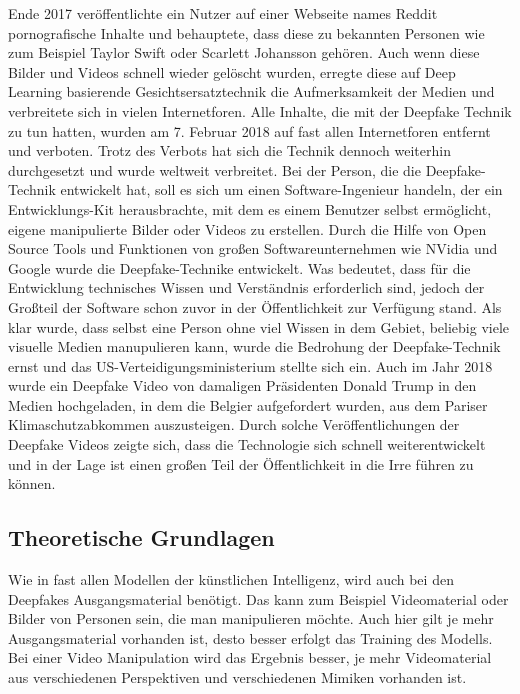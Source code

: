 Ende 2017 veröffentlichte ein Nutzer auf einer Webseite names Reddit pornografische Inhalte und behauptete, dass diese zu bekannten Personen wie zum Beispiel Taylor Swift oder Scarlett Johansson gehören.
Auch wenn diese Bilder und Videos schnell wieder gelöscht wurden, erregte diese auf Deep Learning basierende Gesichtsersatztechnik die Aufmerksamkeit der Medien und verbreitete sich in vielen Internetforen.
Alle Inhalte, die mit der Deepfake Technik zu tun hatten, wurden am 7. Februar 2018 auf fast allen Internetforen entfernt und verboten.
Trotz des Verbots hat sich die Technik dennoch weiterhin durchgesetzt und wurde weltweit verbreitet.
Bei der Person, die die Deepfake-Technik entwickelt hat, soll es sich um einen Software-Ingenieur handeln, der ein Entwicklungs-Kit herausbrachte, mit dem es einem Benutzer selbst ermöglicht, eigene manipulierte Bilder oder Videos zu erstellen.
Durch die Hilfe von Open Source Tools und Funktionen von großen Softwareunternehmen wie NVidia und Google wurde die Deepfake-Technike entwickelt. Was bedeutet, dass für die Entwicklung technisches Wissen und Verständnis erforderlich sind, jedoch der Großteil der Software schon zuvor in der Öffentlichkeit zur Verfügung stand.
Als klar wurde, dass selbst eine Person ohne viel Wissen in dem Gebiet, beliebig viele visuelle Medien manupulieren kann, wurde die Bedrohung der Deepfake-Technik ernst und das US-Verteidigungsministerium stellte sich ein.
Auch im Jahr 2018 wurde ein Deepfake Video von damaligen Präsidenten Donald Trump in den Medien hochgeladen, in dem die Belgier aufgefordert wurden, aus dem Pariser Klimaschutzabkommen auszusteigen.\newline
Durch solche Veröffentlichungen der Deepfake Videos zeigte sich, dass die Technologie sich schnell weiterentwickelt und in der Lage ist einen großen Teil der Öffentlichkeit in die Irre führen zu können.\cite{Jatit}

\subsection{Theoretische Grundlagen}
Wie in fast allen Modellen der künstlichen Intelligenz, wird auch bei den Deepfakes Ausgangsmaterial benötigt. Das kann zum Beispiel Videomaterial oder Bilder von Personen sein, die man manipulieren möchte. Auch hier gilt je mehr Ausgangsmaterial vorhanden ist, desto besser erfolgt das Training des Modells. Bei einer Video Manipulation wird das Ergebnis besser, je mehr Videomaterial aus verschiedenen Perspektiven und verschiedenen Mimiken vorhanden ist.\cite{HochschuleDerMedien}\newline
